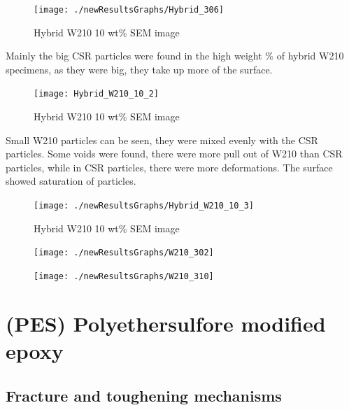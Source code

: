 \documentclass[numbers=noendperiod,chapterprefix=on]{icldt} %
\begin{document}
\begin{figure}[!hp]
\centering
\texttt{[image: ./newResultsGraphs/Hybrid\_306]}
\caption{Hybrid W210 10 wt\% SEM image} \label{Hybrid_306}
\end{figure}
\FloatBarrier


Mainly the big CSR particles were found in the high weight \% of hybrid W210 specimens, as they were big, they take up more of the surface. 

\begin{figure}[!hp]
\centering
\texttt{[image: Hybrid\_W210\_10\_2]}
\caption{Hybrid W210 10 wt\% SEM image} \label{Hybrid_W210_10_2}
\end{figure}
\FloatBarrier

Small W210 particles can be seen, they were mixed evenly with the CSR particles. Some voids were found, there were more pull out of W210 than CSR particles, while in CSR particles, there were more deformations. The surface showed saturation of particles.

\begin{figure}[!hp]
\centering
\texttt{[image: ./newResultsGraphs/Hybrid\_W210\_10\_3]}
\caption{Hybrid W210 10 wt\% SEM image} \label{Hybrid_W210_10_3}
\end{figure}
\FloatBarrier

\begin{figure}[!hp]
\centering
\texttt{[image: ./newResultsGraphs/W210\_302]}
\caption{} \label{W210_302}
\end{figure}
\FloatBarrier
 
\begin{figure}[!hp]
\centering
\texttt{[image: ./newResultsGraphs/W210\_310]}
\caption{} \label{W210_310}
\end{figure}
\FloatBarrier
\section{(PES) Polyethersulfore modified epoxy} \label{PES_SEM}

\subsection{Fracture and toughening mechanisms}
\end{document}
